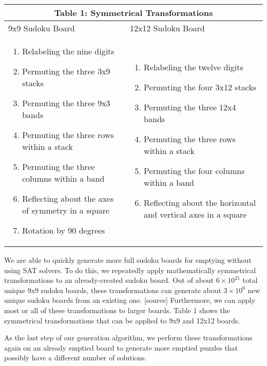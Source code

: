 \singlespace
\begin{table}
\begin{tabularx}{\textwidth}{|X|X|}
\hline
\multicolumn{2}{|c|}{Table 1: Symmetrical Transformations}\\
\hline
9x9 Sudoku Board & 12x12 Sudoku Board
\\
\hline
\begin{enumerate}
\item Relabeling the nine digits
\item Permuting the three 3x9 stacks
\item Permuting the three 9x3 bands
\item Permuting the three rows within a stack
\item Permuting the three columns within a band
\item Reflecting about the axes of symmetry in a square
\item Rotation by 90 degrees
\end{enumerate} &

\begin{enumerate}
\item Relabeling the twelve digits
\item Permuting the four 3x12 stacks
\item Permuting the three 12x4 bands
\item Permuting the three rows within a stack
\item Permuting the four columns within a band
\item Reflecting about the horizontal and vertical axes in a square
\end{enumerate}
 \\
\hline
\end{tabularx}
\end{table}

\doublespace

We are able to quickly generate more full sudoku boards for emptying
without using SAT solvers. To do this, we repeatedly apply mathematically symmetrical transformations to an already-created sudoku board. Out of about $6 \times 10^{21}$ total unique 9x9 sudoku boards, these transformations can generate about $3\times 10^6$ new unique sudoku boards from an existing one. [source] Furthermore, we can apply most or all of these transformations to larger boards. Table 1 shows the symmetrical transformations that can be applied to 9x9 and 12x12 boards.

As the last step of our generation algorithm, we perform these transformations again on an already emptied board to generate more emptied puzzles that possibly have a different number of solutions.


